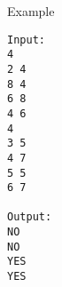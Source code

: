 Example
\begin{verbatim}
Input:
4
2 4
8 4
6 8
4 6
4
3 5
4 7
5 5
6 7

Output:
NO
NO
YES
YES
\end{verbatim}